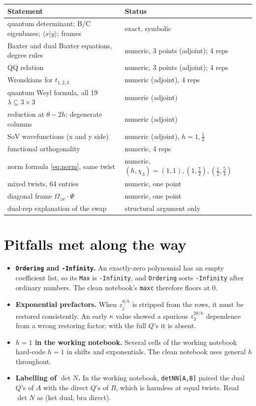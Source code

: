 \documentclass[11pt]{article}
\newcommand{\nb}[1]{\texttt{#1}}
\begin{document}
\begin{longtable}{p{8.2cm}p{6.8cm}}
\toprule
Statement & Status\\\midrule
quantum determinant; B/C eigenbases; $\langle x|y\rangle$; frames & exact, symbolic\\
Baxter and dual Baxter equations, degree rules & numeric, 3 points (adjoint); 4 reps\\
QQ relation & numeric, 3 points (adjoint); 4 reps\\
Wronskians for $t_{1,2,3}$ & numeric (adjoint), 4 reps\\
quantum Weyl formula, all 19 $\lambda\subseteq3\times3$ & numeric (adjoint)\\
reduction at $\theta-2h$; degenerate columns & numeric (adjoint)\\
SoV wavefunctions (x and y side) & numeric (adjoint), $h=1,\tfrac12$\\
functional orthogonality & numeric, 4 reps\\
norm formula \eqref{eq:norm}, same twist & numeric, $(h,\chi_3)=(1,1),(1,\tfrac72),(\tfrac12,\tfrac54)$\\
mixed twists, 64 entries & numeric, one point\\
diagonal frame $\Omega_{zw}\cdot\Psi$ & numeric, one point\\
dual-rep explanation of the swap & structural argument only\\
\bottomrule
\end{longtable}

\section{Pitfalls met along the way}
\begin{itemize}
\item \textbf{\nb{Ordering} and \nb{-Infinity}.} An exactly-zero polynomial has an empty coefficient list, so its \nb{Max} is \nb{-Infinity}, and \nb{Ordering} sorts \nb{-Infinity} after ordinary numbers. The clean notebook's \nb{maxc} therefore floors at 0.
\item \textbf{Exponential prefactors.} When $z_j^{\theta/h}$ is stripped from the rows, it must be restored consistently. An early $\kappa$ value showed a spurious $z_3^{2\theta/h}$ dependence from a wrong restoring factor; with the full $Q$'s it is absent.
\item \textbf{$h=1$ in the working notebook.} Several cells of the working notebook hard-code $h=1$ in shifts and exponentials. The clean notebook uses general $h$ throughout.
\item \textbf{Labelling of $\det N$.} In the working notebook, \nb{detNN[A,B]} paired the dual $Q$'s of $A$ with the direct $Q$'s of $B$, which is harmless at equal twists. Read $\det N$ as (ket dual, bra direct).
\end{itemize}
\end{document}
